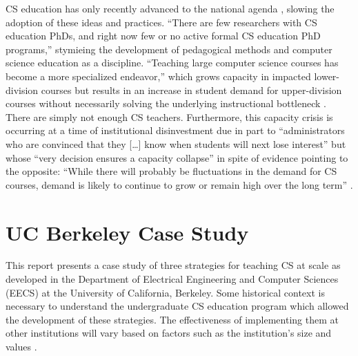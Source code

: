 CS education has only recently advanced to the national agenda \cite{StateofCS2018}, slowing the adoption of these ideas and practices. ``There are few researchers with CS education PhDs, and right now few or no active formal CS education PhD programs,'' \cite{CSforAll2018} stymieing the development of pedagogical methods and computer science education as a discipline. ``Teaching large computer science courses has become a more specialized endeavor,'' which grows capacity in impacted lower-division courses but results in an increase in student demand for upper-division courses without necessarily solving the underlying instructional bottleneck \cite{Roberts:2016}. There are simply not enough CS teachers. Furthermore, this capacity crisis is occurring at a time of institutional disinvestment due in part to ``administrators who are convinced that they [\dots\unkern] know when students will next lose interest'' but whose ``very decision ensures a capacity collapse'' \cite{Roberts:2016} in spite of evidence pointing to the opposite: ``While there will probably be fluctuations in the demand for CS courses, demand is likely to continue to grow or remain high over the long term'' \cite{CSUndergraduateEnrollments}.

\section{UC Berkeley Case Study}

This report presents a case study of three strategies for teaching CS at scale as developed in the Department of Electrical Engineering and Computer Sciences (EECS) at the University of California, Berkeley. Some historical context is necessary to understand the undergraduate CS education program which allowed the development of these strategies. The effectiveness of implementing them at other institutions will vary based on factors such as the institution's size and values \cite{CSUndergraduateEnrollments}.

